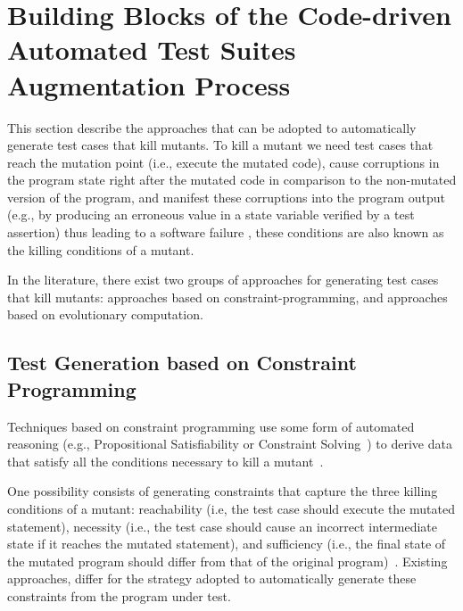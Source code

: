 \clearpage
\section{Building Blocks of the Code-driven Automated Test Suites Augmentation Process}
\label{sec:testGeneration}

This section describe the approaches that can be adopted to automatically generate test cases that kill mutants.
To kill a mutant we need test cases that reach the mutation point (i.e., execute the mutated code), cause 
corruptions
in the program state right after the mutated code in comparison to the non-mutated version of the program, 
and manifest these corruptions into the program output 
(e.g., by producing an erroneous value in a state variable verified by a test assertion) 
thus leading to a software failure \cite{papadakis2019mutation}, these conditions are also known as the killing conditions of a mutant.

In the literature, there exist two groups of approaches for 
generating test cases that kill mutants:
approaches based on constraint-programming, and approaches based on evolutionary computation.

\subsection{Test Generation based on Constraint Programming}

Techniques based on constraint programming use some form of automated reasoning (e.g., Propositional Satisfiability or Constraint Solving~\cite{SATandCPsurvey:2006}) to derive data that satisfy all the conditions necessary to kill a mutant~\cite{offutt1997automatically}.

One possibility consists of generating constraints that capture the three killing conditions of a mutant: reachability (i.e, the test case should execute the mutated statement), necessity (i.e., the test case should cause an incorrect intermediate state if it reaches the mutated statement), and sufficiency (i.e., the final state of the mutated program should differ from that of the original program)~\cite{offutt1997automatically}. Existing approaches, differ for the strategy adopted to automatically generate these constraints from the program under test.

